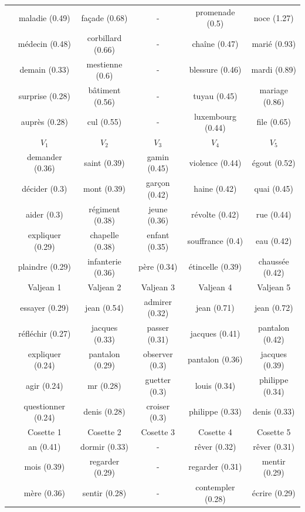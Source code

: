 \documentclass[
twocolumn,
]{ceurart}
\begin{document}
\begin{table}[!h]
\begin{tabular}{|c|c|c|c|c|c|}
		\cline{2-6}
		& maladie (0.49) & façade (0.68) & - & promenade (0.5) & noce (1.27) \\ 
		& médecin (0.48) & corbillard (0.66) & - & chaîne (0.47) & marié (0.93) \\
		& demain (0.33) & mestienne (0.6) & - & blessure (0.46) & mardi (0.89) \\
		& surprise (0.28) & bâtiment (0.56) & - & tuyau (0.45) & mariage (0.86) \\
		& auprès (0.28) & cul (0.55) &- & luxembourg (0.44) & file (0.65) \\ 
		\hline
		\hline
		\parbox[t]{2mm}{} 
		& $V_1$ & $V_2$ & $V_3$ & $V_4$ & $V_5$ \\ 
		& demander (0.36) & saint (0.39) & gamin (0.45) & violence (0.44) & égout (0.52) \\ 
		& décider (0.3) & mont (0.39) & garçon (0.42) & haine (0.42) & quai (0.45) \\ 
		& aider (0.3) & régiment (0.38) & jeune (0.36) & révolte (0.42) & rue (0.44) \\ 
		& expliquer (0.29) & chapelle (0.38) & enfant (0.35) & souffrance (0.4) & eau (0.42) \\
		& plaindre (0.29) & infanterie (0.36) & père (0.34) & étincelle (0.39) & chaussée (0.42) \\
		& Valjean 1 & Valjean 2 & Valjean 3 & Valjean 4 & Valjean 5 \\ 
		& essayer (0.29) & jean (0.54) & admirer (0.32) & jean (0.71) & jean (0.72) \\ 
		& réfléchir (0.27) & jacques (0.33) & passer (0.31) & jacques (0.41) & pantalon (0.42) \\ 
		& expliquer (0.24) & pantalon (0.29) & observer (0.3) & pantalon (0.36) & jacques (0.39) \\ 
		& agir (0.24) & mr (0.28) & guetter (0.3) & louis (0.34) & philippe (0.34) \\ 
		& questionner (0.24) & denis (0.28) & croiser (0.3) & philippe (0.33) & denis (0.33) \\ 
		& Cosette 1 & Cosette 2 & Cosette 3 & Cosette 4 & Cosette 5 \\ 
		& an (0.41) & dormir (0.33) & - & rêver (0.32) & rêver (0.31) \\
		& mois (0.39) & regarder (0.29) & - & regarder (0.31) & mentir (0.29) \\
		& mère (0.36) & sentir (0.28) & - & contempler (0.28) & écrire (0.29) \\

\end{tabular}
\end{table}
\end{document}
